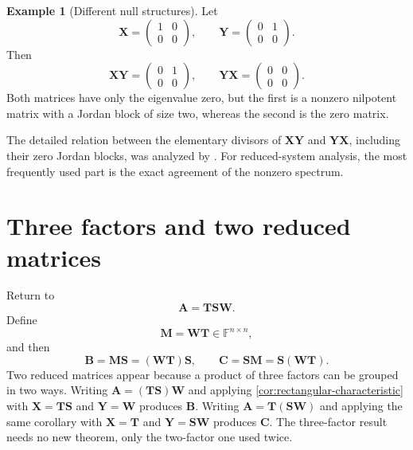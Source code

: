 \documentclass[11pt]{article}
\newcommand{\F}{\mathbb{F}}
\newcommand{\mat}[1]{\mathbf{#1}}
\theoremstyle{definition}
\newtheorem{example}[example]{Example}
\theoremstyle{remark}
\begin{document}
\begin{example}[Different null structures]
Let
\[
  \mat{X}=
  \begin{pmatrix}
    1&0\\
    0&0
  \end{pmatrix},
  \qquad
  \mat{Y}=
  \begin{pmatrix}
    0&1\\
    0&0
  \end{pmatrix}.
\]
Then
\[
  \mat{X}\mat{Y}
  =
  \begin{pmatrix}
    0&1\\
    0&0
  \end{pmatrix},
  \qquad
  \mat{Y}\mat{X}
  =
  \begin{pmatrix}
    0&0\\
    0&0
  \end{pmatrix}.
\]
Both matrices have only the eigenvalue zero, but the first is a nonzero nilpotent matrix with a Jordan block of size two, whereas the second is the zero matrix.
\end{example}

The detailed relation between the elementary divisors of \(\mat{X}\mat{Y}\) and \(\mat{Y}\mat{X}\), including their zero Jordan blocks, was analyzed by \textcite{flanders1951elementary}. For reduced-system analysis, the most frequently used part is the exact agreement of the nonzero spectrum.

\section{Three factors and two reduced matrices}
\label{sec:three-factors}

Return to
\[
  \mat{A}=\mat{T}\mat{S}\mat{W}.
\]
Define
\begin{equation}
  \mat{M}=\mat{W}\mat{T}\in\F^{n\times n},
  \label{eq:M-definition}
\end{equation}
and then
\begin{equation}
  \mat{B}=\mat{M}\mat{S}=(\mat{W}\mat{T})\mat{S},
  \qquad
  \mat{C}=\mat{S}\mat{M}=\mat{S}(\mat{W}\mat{T}).
  \label{eq:B-C-definition}
\end{equation}
Two reduced matrices appear because a product of three factors can be grouped in two ways. Writing \(\mat{A}=(\mat{T}\mat{S})\mat{W}\) and applying \cref{cor:rectangular-characteristic} with \(\mat{X}=\mat{T}\mat{S}\) and \(\mat{Y}=\mat{W}\) produces \(\mat{B}\). Writing \(\mat{A}=\mat{T}(\mat{S}\mat{W})\) and applying the same corollary with \(\mat{X}=\mat{T}\) and \(\mat{Y}=\mat{S}\mat{W}\) produces \(\mat{C}\). The three-factor result needs no new theorem, only the two-factor one used twice.
\end{document}
